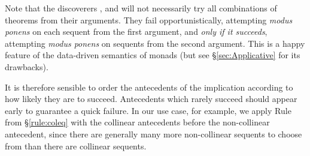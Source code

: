 Note that the discoverers ,  and  will not necessarily try all combinations of theorems from their arguments. They fail opportunistically, attempting \emph{modus ponens} on each sequent from the first argument, and \emph{only if it succeeds}, attempting \emph{modus ponens} on sequents from the second argument. This is a happy feature of the data-driven semantics of monads (but see \S\ref{sec:Applicative} for its drawbacks). 

It is therefore sensible to order the antecedents of the implication according to how likely they are to succeed. Antecedents which rarely succeed should appear early to guarantee a quick failure. In our use case, for example, we apply Rule  from \S\ref{rule:coleq} with the collinear antecedents before the non-collinear antecedent, since there are generally many more non-collinear sequents to choose from than there are collinear sequents.







